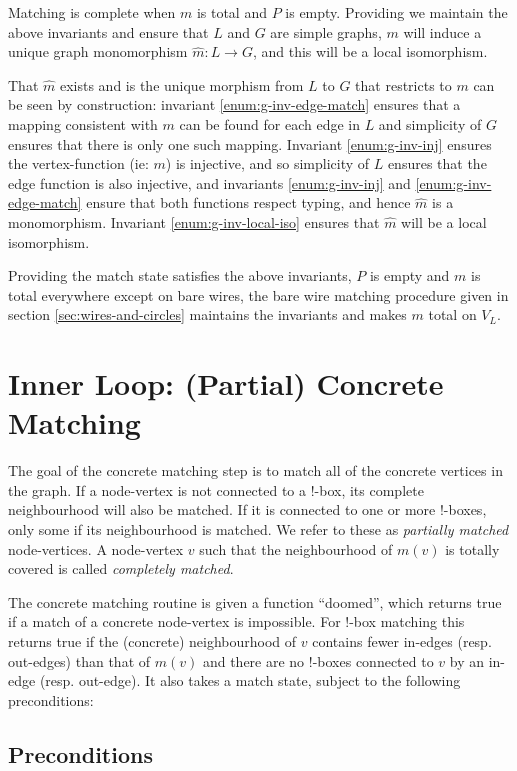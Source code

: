 \documentclass{article}
\begin{document}
Matching is complete when $m$ is total and $P$ is empty.  Providing we maintain the above invariants and ensure that $L$ and $G$ are simple graphs, $m$ will induce a unique graph monomorphism $\hat m:L \rightarrow G$, and this will be a local isomorphism.

That $\hat m$ exists and is the unique morphism from $L$ to $G$ that restricts to $m$ can be seen by construction: invariant \ref{enum:g-inv-edge-match} ensures that a mapping consistent with $m$ can be found for each edge in $L$ and simplicity of $G$ ensures that there is only one such mapping.  Invariant \ref{enum:g-inv-inj} ensures the vertex-function (ie: $m$) is injective, and so simplicity of $L$ ensures that the edge function is also injective, and invariants \ref{enum:g-inv-inj} and \ref{enum:g-inv-edge-match} ensure that both functions respect typing, and hence $\hat m$ is a monomorphism.  Invariant \ref{enum:g-inv-local-iso} ensures that $\hat m$ will be a local isomorphism.

Providing the match state satisfies the above invariants, $P$ is empty and $m$ is total everywhere except on bare wires, the bare wire matching procedure given in section \ref{sec:wires-and-circles} maintains the invariants and makes $m$ total on $V_L$.


\section{Inner Loop: (Partial) Concrete Matching}
\label{sec:inner-loop}

The goal of the concrete matching step is to match all of the concrete vertices in the graph. If a node-vertex is not connected to a !-box, its complete neighbourhood will also be matched. If it is connected to one or more !-boxes, only some if its neighbourhood is matched. We refer to these as \textit{partially matched} node-vertices. A node-vertex $v$ such that the neighbourhood of $m(v)$ is totally covered is called \textit{completely matched}.

The concrete matching routine is given a function ``doomed'', which returns true if a match of a concrete node-vertex is impossible. For !-box matching this returns true if the (concrete) neighbourhood of $v$ contains fewer in-edges (resp. out-edges) than that of $m(v)$ and there are no !-boxes connected to $v$ by an in-edge (resp. out-edge). It also takes a match state, subject to the following preconditions:

\subsection{Preconditions}
\label{sec:il-precond}
\end{document}
